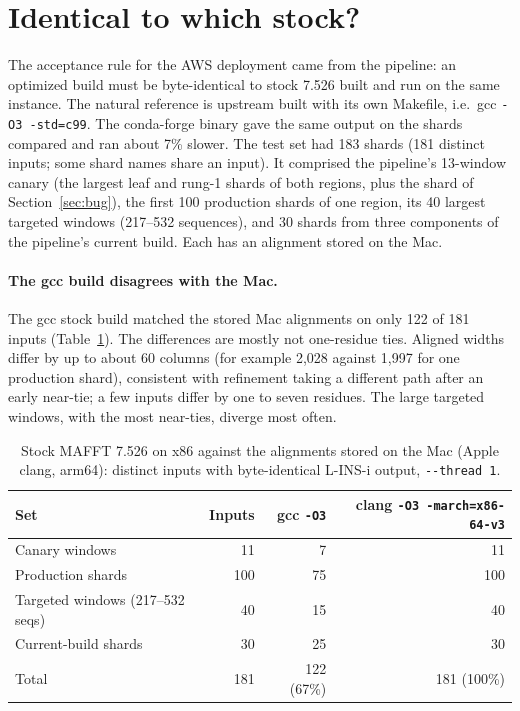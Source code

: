 \documentclass[11pt]{article}
\newcommand{\code}[1]{\texttt{#1}}
\begin{document}
\section{Identical to which stock?}
\label{sec:xplat}

The acceptance rule for the AWS deployment came from the pipeline: an optimized build must
be byte-identical to stock 7.526 built and run on the same instance. The natural reference is
upstream built with its own Makefile, i.e.\ gcc \code{-O3 -std=c99}. The conda-forge binary
gave the same output on the shards compared and ran about 7\% slower. The test set had 183
shards (181 distinct inputs; some shard names share an input). It comprised the pipeline's
13-window canary (the largest leaf and rung-1 shards of both regions, plus the shard of
Section~\ref{sec:bug}), the first 100 production shards of one region, its 40 largest targeted
windows (217--532 sequences), and 30 shards from three components of the pipeline's current build.
Each has an alignment stored on the Mac.

\paragraph{The gcc build disagrees with the Mac.} The gcc stock build matched the stored Mac
alignments on only 122 of 181 inputs (Table~\ref{tab:xplat}). The differences are mostly not
one-residue ties. Aligned widths differ by up to about 60 columns (for example 2{,}028
against 1{,}997 for one production shard), consistent with refinement taking a different path
after an early near-tie; a few inputs differ by one to seven residues. The large targeted
windows, with the most near-ties, diverge most often.

\begin{table}[h]
\centering
\caption{Stock MAFFT 7.526 on x86 against the alignments stored on the Mac (Apple clang,
arm64): distinct inputs with byte-identical L-INS-i output, \code{-{}-thread 1}.}
\label{tab:xplat}
\begin{tabular}{lrrr}
\toprule
Set & Inputs & gcc \code{-O3} & clang \code{-O3 -march=x86-64-v3} \\
\midrule
Canary windows & 11 & 7 & 11 \\
Production shards & 100 & 75 & 100 \\
Targeted windows (217--532 seqs) & 40 & 15 & 40 \\
Current-build shards & 30 & 25 & 30 \\
\midrule
Total & 181 & 122 (67\%) & 181 (100\%) \\
\bottomrule
\end{tabular}
\end{table}
\end{document}

